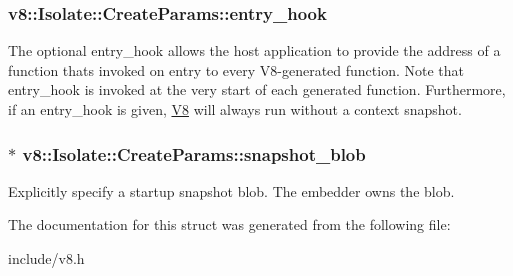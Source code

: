 \subsubsection[{\texorpdfstring{entry\+\_\+hook}{entry_hook}}]{ v8\+::\+Isolate\+::\+Create\+Params\+::entry\+\_\+hook}\hypertarget{structv8_1_1_isolate_1_1_create_params_aa7aa18bbe2d86713e5b074a93b38dc60}{}\label{structv8_1_1_isolate_1_1_create_params_aa7aa18bbe2d86713e5b074a93b38dc60}
The optional entry\+\_\+hook allows the host application to provide the address of a function that\textquotesingle{}s invoked on entry to every V8-\/generated function. Note that entry\+\_\+hook is invoked at the very start of each generated function. Furthermore, if an entry\+\_\+hook is given, \hyperlink{classv8_1_1_v8}{V8} will always run without a context snapshot. 
\subsubsection[{\texorpdfstring{snapshot\+\_\+blob}{snapshot_blob}}]{$\ast$ v8\+::\+Isolate\+::\+Create\+Params\+::snapshot\+\_\+blob}\hypertarget{structv8_1_1_isolate_1_1_create_params_a25d38476e4dec79ae96c59292eee4a64}{}\label{structv8_1_1_isolate_1_1_create_params_a25d38476e4dec79ae96c59292eee4a64}
Explicitly specify a startup snapshot blob. The embedder owns the blob. 

The documentation for this struct was generated from the following file\+:\begin{DoxyCompactItemize}
\item 
include/v8.\+h\end{DoxyCompactItemize}
